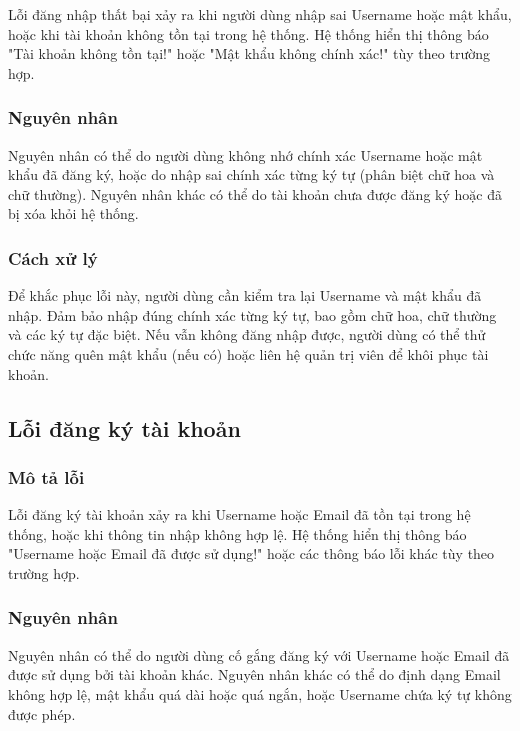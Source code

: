 Lỗi đăng nhập thất bại xảy ra khi người dùng nhập sai Username hoặc mật khẩu, hoặc khi tài khoản không tồn tại trong hệ thống. Hệ thống hiển thị thông báo "Tài khoản không tồn tại!" hoặc "Mật khẩu không chính xác!" tùy theo trường hợp.

\subsubsection{Nguyên nhân}

Nguyên nhân có thể do người dùng không nhớ chính xác Username hoặc mật khẩu đã đăng ký, hoặc do nhập sai chính xác từng ký tự (phân biệt chữ hoa và chữ thường). Nguyên nhân khác có thể do tài khoản chưa được đăng ký hoặc đã bị xóa khỏi hệ thống.

\subsubsection{Cách xử lý}

Để khắc phục lỗi này, người dùng cần kiểm tra lại Username và mật khẩu đã nhập. Đảm bảo nhập đúng chính xác từng ký tự, bao gồm chữ hoa, chữ thường và các ký tự đặc biệt. Nếu vẫn không đăng nhập được, người dùng có thể thử chức năng quên mật khẩu (nếu có) hoặc liên hệ quản trị viên để khôi phục tài khoản.

\subsection{Lỗi đăng ký tài khoản}

\subsubsection{Mô tả lỗi}

Lỗi đăng ký tài khoản xảy ra khi Username hoặc Email đã tồn tại trong hệ thống, hoặc khi thông tin nhập không hợp lệ. Hệ thống hiển thị thông báo "Username hoặc Email đã được sử dụng!" hoặc các thông báo lỗi khác tùy theo trường hợp.

\subsubsection{Nguyên nhân}

Nguyên nhân có thể do người dùng cố gắng đăng ký với Username hoặc Email đã được sử dụng bởi tài khoản khác. Nguyên nhân khác có thể do định dạng Email không hợp lệ, mật khẩu quá dài hoặc quá ngắn, hoặc Username chứa ký tự không được phép.

